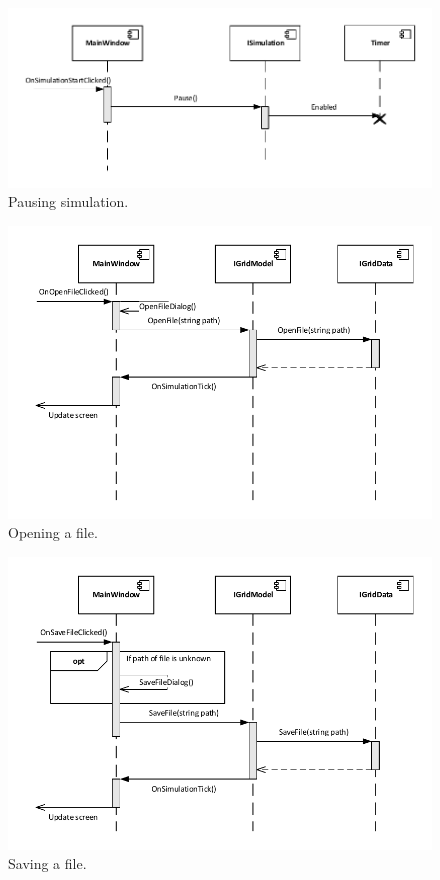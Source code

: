 \begin{figure}[!ht]
	\centering
	\includegraphics{figures/Pausing}
	\caption{Pausing simulation.}
\end{figure}

\begin{figure}[!ht]
	\centering
	\includegraphics{figures/LoadFile}
	\caption{Opening a file.}
\end{figure}

\begin{figure}[!ht]
	\centering
	\includegraphics{figures/SaveFile}
	\caption{Saving a file.}
\end{figure}

